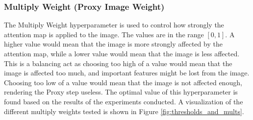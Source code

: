 \subsubsection{Multiply Weight (Proxy Image Weight)}
The Multiply Weight hyperparameter is used to control how strongly the attention map is applied to the image. The values are in the range $[0,1]$. A higher value would mean that the image is more strongly affected by the attention map, while a lower value would mean that the image is less affected. This is a balancing act as choosing too high of a value would mean that the image is affected too much, and important features might be lost from the image. Choosing too low of a value would mean that the image is not affected enough, rendering the Proxy step useless. The optimal value of this hyperparameter is found based on the results of the experiments conducted. A visualization of the different multiply weights tested is shown in Figure \ref{fig:thresholds_and_mults}.

